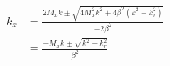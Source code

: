 







\begin{align*}
    k_x &= \frac{2M_x k \pm \sqrt{4 M_x^2 k^2 + 4 \beta^2 \left( k^2 - k_r^2 \right)}}{-2\beta^2}\\
        &= \frac{-M_x k \pm \sqrt{k^2 - k_r^2}}{\beta^2}
\end{align*}












